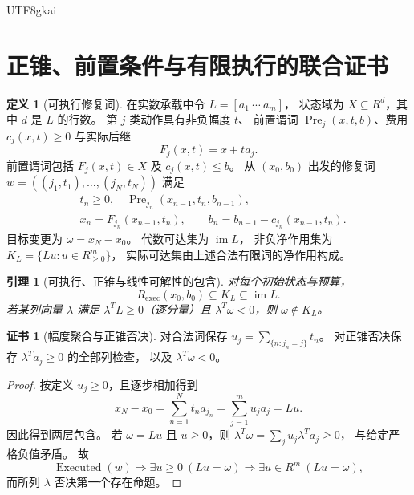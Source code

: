 \documentclass[12pt,a4paper,openany,notitlepage]{report}
\theoremstyle{plain}
\newtheorem{lemma}[theorem]{引理}
\theoremstyle{definition}
\newtheorem{definition}[theorem]{定义}
\newtheorem*{certificate}{证书}
\theoremstyle{remark}
\def\mathcal#1{#1}\def\mathsf#1{#1}\def\mathbb#1{#1}%
\begin{document}
\begin{CJK*}{UTF8}{gkai}
\section{正锥、前置条件与有限执行的联合证书}
\label{hgov:executable}

\begin{definition}[可执行修复词]
\label{hgov:def-executable}
在实数承载中令 $L=[a_1\ \cdots\ a_m]$，
状态域为 $X\subseteq\mathbb R^d$，其中 $d$ 是 $L$ 的行数。
第 $j$ 类动作具有非负幅度 $t$、
前置谓词 $\operatorname{Pre}_j(x,t,b)$、费用
$c_j(x,t)\ge0$ 与实际后继
\[
 F_j(x,t)=x+ta_j.
\]
前置谓词包括 $F_j(x,t)\in X$ 及 $c_j(x,t)\le b$。
从 $(x_0,b_0)$ 出发的修复词
$w=((j_1,t_1),\ldots,(j_N,t_N))$ 满足
\[
 \begin{aligned}
 &t_n\ge0,\quad
 \operatorname{Pre}_{j_n}(x_{n-1},t_n,b_{n-1}),\\
 &x_n=F_{j_n}(x_{n-1},t_n),\qquad
 b_n=b_{n-1}-c_{j_n}(x_{n-1},t_n).
 \end{aligned}
\]
目标变更为 $\omega=x_N-x_0$。
代数可达集为 $\operatorname{im}L$，
非负净作用集为
$\mathcal K_L=\{Lu:u\in\mathbb R_{\ge0}^m\}$，
实际可达集由上述合法有限词的净作用构成。
\end{definition}

\begin{lemma}[可执行、正锥与线性可解性的包含]
\label{hgov:lem-cone}
对每个初始状态与预算，
\[
 \mathcal R_{\mathrm{exec}}(x_0,b_0)
 \subseteq\mathcal K_L\subseteq\operatorname{im}L.
\]
若某列向量 $\lambda$ 满足
$\lambda^{\mathsf T}L\ge0$（逐分量）且
$\lambda^{\mathsf T}\omega<0$，则 $\omega\notin\mathcal K_L$。
\end{lemma}
\begin{certificate}[幅度聚合与正锥否决]
对合法词保存
$u_j=\sum_{\{n:j_n=j\}}t_n$。
对正锥否决保存 $\lambda^{\mathsf T}a_j\ge0$ 的全部列检查，
以及 $\lambda^{\mathsf T}\omega<0$。
\end{certificate}
\begin{proof}
按定义 $u_j\ge0$，且逐步相加得到
\[
 x_N-x_0=\sum_{n=1}^Nt_na_{j_n}
 =\sum_{j=1}^mu_ja_j=Lu.
\]
因此得到两层包含。
若 $\omega=Lu$ 且 $u\ge0$，则
$\lambda^{\mathsf T}\omega
 =\sum_ju_j\lambda^{\mathsf T}a_j\ge0$，
与给定严格负值矛盾。
故
\[
 \operatorname{Executed}(w)
 \Longrightarrow\exists u\ge0\ (Lu=\omega)
 \Longrightarrow\exists u\in\mathbb R^m\ (Lu=\omega),
\]
而所列 $\lambda$ 否决第一个存在命题。
\end{proof}


\end{CJK*}
\end{document}

